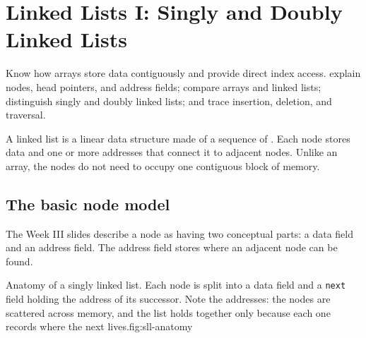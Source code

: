 \chapter{Linked Lists I: Singly and Doubly Linked Lists}\label{ch:linked-lists}

\chapterguide%
  {Know how arrays store data contiguously and provide direct index access.}
  {explain nodes, head pointers, and address fields; compare arrays and linked lists; distinguish singly and doubly linked lists; and trace insertion, deletion, and traversal.}

A linked list is a linear data structure made of a sequence of . Each node stores data and one or more addresses that connect it to adjacent nodes. Unlike an array, the nodes do not need to occupy one contiguous block of memory.

\section{The basic node model}

The Week III slides describe a node as having two conceptual parts: a data field and an address field. The address field stores where an adjacent node can be found.

\begin{utpfig}{Anatomy of a singly linked list. Each node is split into a data field and a
\texttt{next} field holding the address of its successor. Note the addresses: the nodes are
scattered across memory, and the list holds together only because each one records where
the next lives.}{fig:sll-anatomy}
\end{utpfig}

